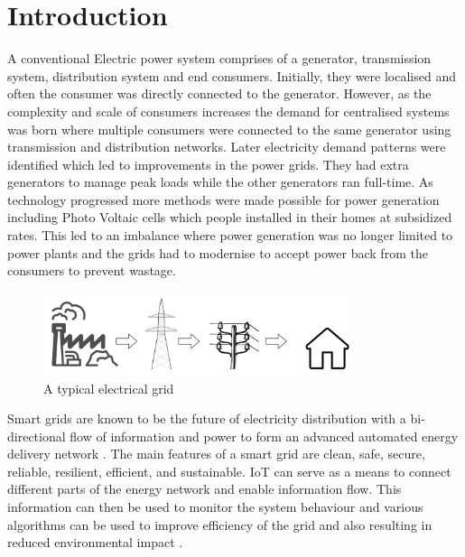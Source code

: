 \chapter{Introduction}\label{introduction} %

A conventional Electric power system comprises of a generator, transmission system, distribution system and end consumers. Initially, they were localised and often the consumer was directly connected to the generator. However, as the complexity and scale of consumers increases the demand for centralised systems was born where multiple consumers were connected to the same generator using transmission and distribution networks. Later electricity demand patterns were identified which led to improvements in the power grids. They had extra generators to manage peak loads while the other generators ran full-time. As technology progressed more methods were made possible for power generation including Photo Voltaic cells which people installed in their homes at subsidized rates. This led to an imbalance where power generation was no longer limited to power plants and the grids had to modernise to accept power back from the consumers to prevent wastage.

\begin{figure}[h]
    \centering
    \includegraphics[width=0.8\textwidth]{ElectricalGrid.png}
    \caption{A typical electrical grid}
    \label{fig:ElectricalGrid}
\end{figure}

Smart grids are known to be the future of electricity distribution with a bi-directional flow of information and power to form an advanced automated energy delivery network \citep{RN6}. The main features of a smart grid are clean, safe, secure, reliable, resilient, efficient, and sustainable\citep{RN6}. IoT can serve as a means to connect different parts of the energy network and enable information flow. This information can then be used to monitor the system behaviour and various algorithms can be used to improve efficiency of the grid and also resulting in reduced environmental impact \citep{RN11,RN10,RN13}.

